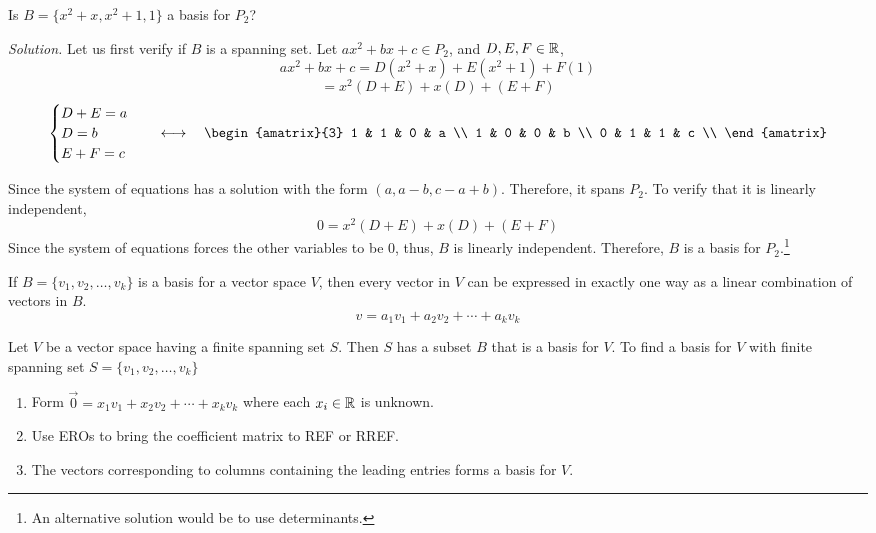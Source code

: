\begin{example}
Is $B = \{x^2 + x, x^2 + 1, 1\}$ a basis for $P_2$?
\end{example}

\textit{Solution.} Let us first verify if $B$ is a spanning set. Let $ax^2 + bx + c \in P_2$, and $D, E, F \in \mathbb{R}$,
$$ax^2 + bx + c = D(x^2 + x) + E(x^2 + 1) + F(1)$$
$$=x^2(D + E) + x(D) + (E + F)$$
$$\begin{cases}
    D + E = a \\
    D = b \\
    E + F = c
\end{cases}
\quad \longleftrightarrow \quad
\begin{amatrix}{3}
    1 & 1 & 0 & a \\
    1 & 0 & 0 & b \\
    0 & 1 & 1 & c \\
\end{amatrix}
$$

Since the system of equations has a solution with the form $(a, a - b, c - a + b)$. Therefore, it spans $P_2$. To verify that it is linearly independent,
$$0 = x^2(D + E) +x(D) + (E + F)$$
Since the system of equations forces the other variables to be 0, thus, $B$ is linearly independent. Therefore, $B$ is a basis for $P_2$.\footnote{An alternative solution would be to use determinants.}


\newpage
\begin{theorem}
If $B = \{v_1, v_2, \dots, v_k\}$ is a basis for a vector space $V$, then every vector in $V$ can be expressed in exactly one way as a linear combination of vectors in $B$.
$$v = a_1v_1 + a_2v_2 + \cdots + a_kv_k$$
\end{theorem}

\begin{theorem}
Let $V$ be a vector space having a finite spanning set $S$. Then $S$ has a subset $B$ that is a basis for $V$. To find a basis for $V$ with finite spanning set $S = \{v_1, v_2, \dots, v_k\}$
\begin{enumerate}
    \item Form $\vec{0} = x_1v_1 + x_2v_2 + \cdots + x_kv_k$ where each $x_i \in \mathbb{R}$ is unknown.
    \item Use EROs to bring the coefficient matrix to REF or RREF.
    \item The vectors corresponding to columns containing the leading entries forms a basis for $V$.
\end{enumerate}
\end{theorem}

